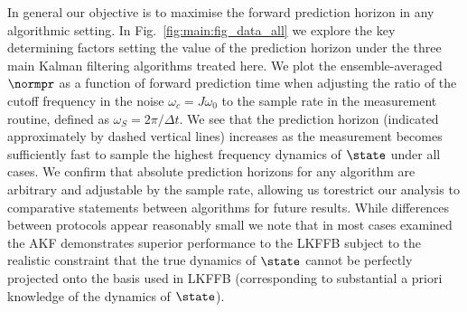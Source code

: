 In general our objective is to maximise the forward prediction horizon in any algorithmic setting.  In Fig.~\ref{fig:main:fig_data_all} we explore the key determining factors setting the value of the prediction horizon under the three main Kalman filtering algorithms treated here.  We plot the ensemble-averaged $\normpr$ as a function of forward prediction time when adjusting the ratio of the cutoff frequency in the noise $\omega_{c}=J\omega_{0}$ to the sample rate in the measurement routine, defined as $\omega_{S}=2\pi/\Delta t$.  We see that the prediction horizon (indicated approximately by dashed vertical lines) increases as the measurement becomes sufficiently fast to sample the highest frequency dynamics of $\state$ under all cases.  We confirm that absolute prediction horizons for any algorithm are arbitrary and adjustable by the sample rate, allowing us torestrict our analysis to comparative statements between algorithms for future results.  While differences between protocols appear reasonably small we note that in most cases examined the AKF demonstrates superior performance to the LKFFB subject to the realistic constraint that the true dynamics of $\state$ cannot be perfectly projected onto the basis used in LKFFB (corresponding to substantial a priori knowledge of the dynamics of $\state$).
\\
\\



